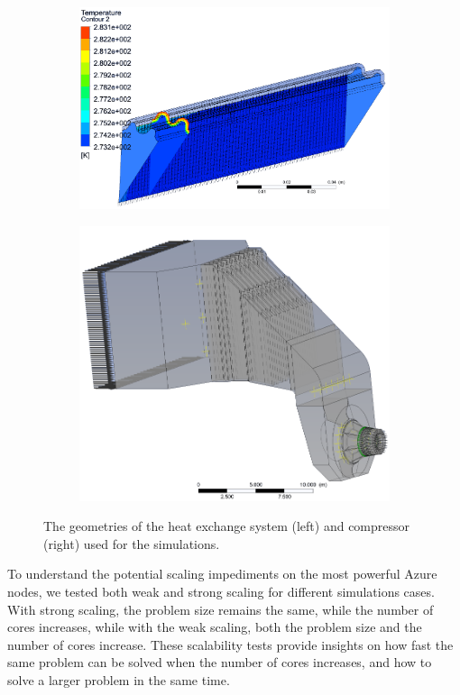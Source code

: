 \documentclass[3p,times]{elsarticle}
\begin{document}
\begin{figure}
\centering
\begin{subfigure}{.4\textwidth}
	\centering
	\includegraphics[width=\linewidth]{pipe_nobg}	
	\label{fig:pipe}
\end{subfigure}
\begin{subfigure}{.5\textwidth}
	\centering
	\includegraphics[width=.7\linewidth]{compressor_nobg}
	\label{fig:compressor}
\end{subfigure}

\caption{The geometries of the heat exchange system (left) and compressor (right) used for the simulations. }
\label{fig:cfx}
\end{figure}

To understand the potential scaling impediments on the most powerful Azure nodes, we tested both weak and strong scaling for different simulations cases. With strong scaling, the problem size remains the same, while the number of cores increases, while with the weak scaling, both the problem size and the number of cores increase. These scalability tests provide insights on how fast the same problem can be solved when the number of cores increases, and how to solve a larger problem in the same time. 
\end{document}

